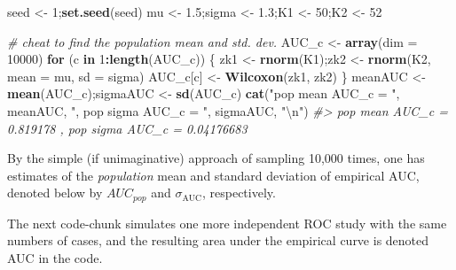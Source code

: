 \documentclass[
]{book}
\newenvironment{Shaded}{\begin{snugshade}}{\end{snugshade}}
\newcommand{\CharTok}[1]{\textcolor[rgb]{0.31,0.60,0.02}{#1}}
\newcommand{\CommentTok}[1]{\textcolor[rgb]{0.56,0.35,0.01}{\textit{#1}}}
\newcommand{\ControlFlowTok}[1]{\textcolor[rgb]{0.13,0.29,0.53}{\textbf{#1}}}
\newcommand{\DataTypeTok}[1]{\textcolor[rgb]{0.13,0.29,0.53}{#1}}
\newcommand{\DecValTok}[1]{\textcolor[rgb]{0.00,0.00,0.81}{#1}}
\newcommand{\FloatTok}[1]{\textcolor[rgb]{0.00,0.00,0.81}{#1}}
\newcommand{\KeywordTok}[1]{\textcolor[rgb]{0.13,0.29,0.53}{\textbf{#1}}}
\newcommand{\NormalTok}[1]{#1}
\newcommand{\OperatorTok}[1]{\textcolor[rgb]{0.81,0.36,0.00}{\textbf{#1}}}
\newcommand{\StringTok}[1]{\textcolor[rgb]{0.31,0.60,0.02}{#1}}
\begin{document}
\begin{Shaded}
\begin{Highlighting}[]
\NormalTok{seed \textless{}{-}}\StringTok{ }\DecValTok{1}\NormalTok{;}\KeywordTok{set.seed}\NormalTok{(seed)}
\NormalTok{mu \textless{}{-}}\StringTok{ }\FloatTok{1.5}\NormalTok{;sigma \textless{}{-}}\StringTok{ }\FloatTok{1.3}\NormalTok{;K1 \textless{}{-}}\StringTok{ }\DecValTok{50}\NormalTok{;K2 \textless{}{-}}\StringTok{ }\DecValTok{52}

\CommentTok{\# cheat to find the population mean and std. dev.}
\NormalTok{AUC\_c \textless{}{-}}\StringTok{ }\KeywordTok{array}\NormalTok{(}\DataTypeTok{dim =} \DecValTok{10000}\NormalTok{)}
\ControlFlowTok{for}\NormalTok{ (c }\ControlFlowTok{in} \DecValTok{1}\OperatorTok{:}\KeywordTok{length}\NormalTok{(AUC\_c)) \{}
\NormalTok{  zk1 \textless{}{-}}\StringTok{ }\KeywordTok{rnorm}\NormalTok{(K1);zk2 \textless{}{-}}\StringTok{ }\KeywordTok{rnorm}\NormalTok{(K2, }\DataTypeTok{mean =}\NormalTok{ mu, }\DataTypeTok{sd =}\NormalTok{ sigma)  }
\NormalTok{  AUC\_c[c] \textless{}{-}}\StringTok{ }\KeywordTok{Wilcoxon}\NormalTok{(zk1, zk2)}
\NormalTok{\}}
\NormalTok{meanAUC   \textless{}{-}}\StringTok{  }\KeywordTok{mean}\NormalTok{(AUC\_c);sigmaAUC  \textless{}{-}}\StringTok{  }\KeywordTok{sd}\NormalTok{(AUC\_c)}
\KeywordTok{cat}\NormalTok{(}\StringTok{"pop mean AUC\_c = "}\NormalTok{, meanAUC, }
    \StringTok{", pop sigma AUC\_c = "}\NormalTok{, sigmaAUC, }\StringTok{"}\CharTok{\textbackslash{}n}\StringTok{"}\NormalTok{)}
\CommentTok{\#\textgreater{} pop mean AUC\_c =  0.819178 , pop sigma AUC\_c =  0.04176683}
\end{Highlighting}
\end{Shaded}

By the simple (if unimaginative) approach of sampling 10,000 times, one has estimates of the \emph{population} mean and standard deviation of empirical AUC, denoted below by \(AUC_{pop}\) and \(\sigma_{\text{AUC}}\), respectively.

The next code-chunk simulates one more independent ROC study with the same numbers of cases, and the resulting area under the empirical curve is denoted AUC in the code.
\end{document}
